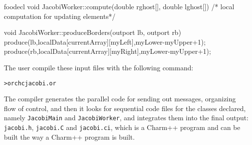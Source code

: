 \documentclass[10pt]{article}
\def\smallfbox#1{\small \fbox{#1}}
\begin{document}
\begin{SaveVerbatim}{foodecl}
void JacobiWorker::compute(double rghost[], double lghost[]){
    /* local computation for updating elements*/
}

void JacobiWorker::produceBorders(outport lb, outport rb){
    produce(lb,localData[currentArray][myLeft],myLower-myUpper+1);
    produce(rb,localData[currentArray][myRight],myLower-myUpper+1);
}
\end{SaveVerbatim}
\vspace{0.1in}
\smallfbox{\BUseVerbatim{foodecl}}
\vspace{0.1in}

The user compile these input files with the following command:

\begin{alltt}
> orchc jacobi.or
\end{alltt}

The compiler generates the parallel code for sending out messages, organizing
flow of control, and then it looks for sequential code files for the classes
declared, namely {\tt JacobiMain} and {\tt JacobiWorker}, and integrates them
into the final output: {\tt jacobi.h}, {\tt jacobi.C} and {\tt jacobi.ci}, which
is a Charm++ program and can be built the way a Charm++ program is built.
\end{document}
